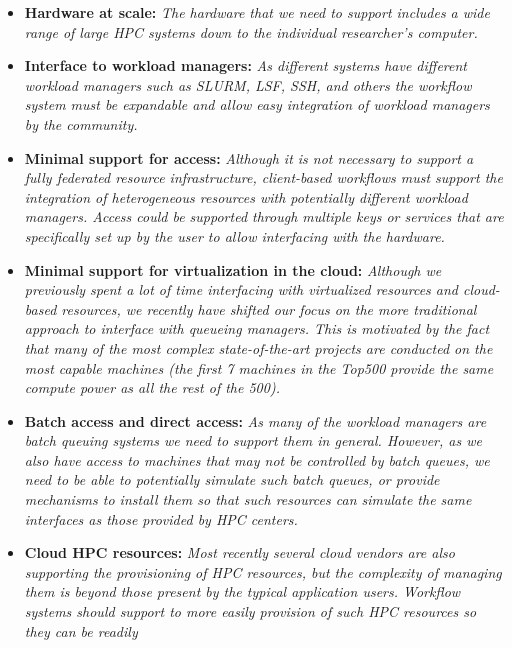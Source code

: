\documentclass[utf8]{FrontiersinVancouver} %
\begin{document}
\begin{BOX}

\begin{itemize}
\item {\bf Hardware at scale:} {\it The hardware that we need to
    support includes a wide range of large HPC systems down to the individual researcher's computer.}
\item {\bf Interface to workload managers:} {\it As different systems
    have different workload managers such as SLURM, LSF, SSH, and
    others the workflow system must be expandable and allow easy
    integration of workload managers by the community.}  
\item {\bf Minimal support for access:} {\it Although it is not
    necessary to support a fully federated resource infrastructure,
    client-based workflows must support the integration of
    heterogeneous resources with potentially different workload
    managers. Access could be supported through multiple keys or
    services that are specifically set up by the user to allow
    interfacing with the hardware.}
\item {\bf Minimal support for virtualization in the cloud:} {\it Although we
    previously spent a lot of time interfacing with virtualized
    resources and cloud-based resources, we recently have shifted our
    focus on the more traditional approach to interface with queueing
    managers. This is motivated by the fact that many of the
    most complex state-of-the-art projects are conducted on the most
    capable machines (the first 7 machines in the Top500 provide the
    same compute power as all the rest of the 500).}
\item {\bf Batch access and direct access:} {\it As many of the
    workload managers are batch queuing systems we need to support
    them in general. However, as we also have access to machines that
    may not be controlled by batch queues, we need to be able to
    potentially simulate such batch queues, or provide mechanisms to
    install them so that such resources can simulate the same
    interfaces as those provided by HPC centers.}
 \item {\bf Cloud HPC resources:} {\it Most recently several cloud
     vendors are also supporting the provisioning of HPC resources,
     but the complexity of managing them is beyond those present by the
     typical application users. Workflow systems should support to
     more easily provision of such HPC resources so they can be readily
}
\end{itemize}
\end{BOX}
\end{document}

